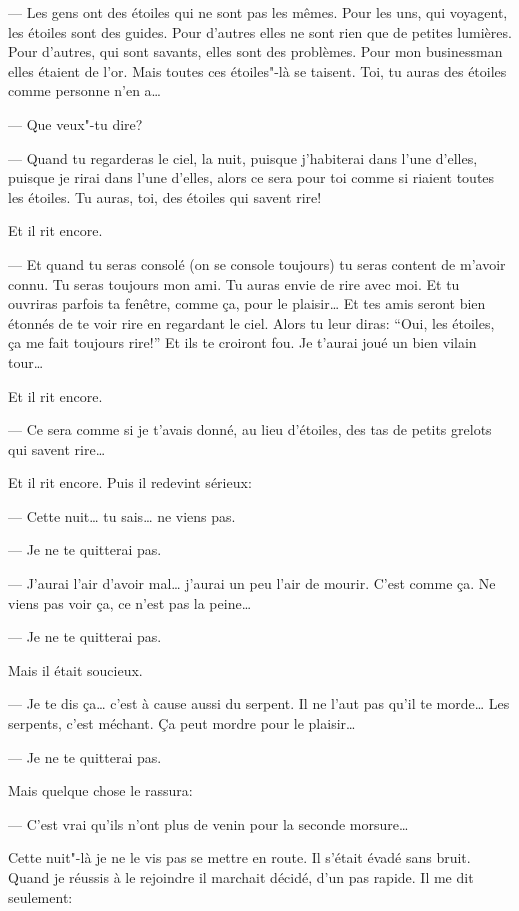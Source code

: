 \begin{Parallel}[p]{}{}
{--- Les gens ont des étoiles qui ne sont pas les mêmes. Pour les uns, qui
voyagent, les étoiles sont des guides. Pour d'autres elles ne sont rien que
de petites lumières. Pour d’autres, qui sont savants, elles sont des problèmes.
Pour mon businessman elles étaient de l'or. Mais toutes ces étoiles"-là se
taisent. Toi, tu auras des étoiles comme personne n'en a\ldots{}

--- Que veux"-tu dire?

--- Quand tu regarderas le ciel, la nuit, puisque j'habiterai dans l'une
d'elles, puisque je rirai dans l'une d'elles, alors ce sera pour toi comme si
riaient toutes les étoiles. Tu auras, toi, des étoiles qui savent rire!

Et il rit encore.

--- Et quand tu seras consolé (on se console toujours) tu seras content de
m'avoir connu. Tu seras toujours mon ami. Tu auras envie de rire avec moi. Et
tu ouvriras parfois ta fenêtre, comme ça, pour le plaisir\ldots{} Et tes amis
seront bien étonnés de te voir rire en regardant le ciel. Alors tu leur diras:
``Oui, les étoiles, ça me fait toujours rire!'' Et ils te croiront fou. Je
t'aurai joué un bien vilain tour\ldots{}

Et il rit encore.

--- Ce sera comme si je t'avais donné, au lieu d'étoiles, des tas de petits
grelots qui savent rire\ldots{}

Et il rit encore. Puis il redevint sérieux:

--- Cette nuit\ldots{} tu sais\ldots{} ne viens pas.

--- Je ne te quitterai pas.

--- J'aurai l'air d'avoir mal\ldots{} j'aurai un peu l'air de mourir. C'est
comme ça. Ne viens pas voir ça, ce n'est pas la peine\ldots{}

--- Je ne te quitterai pas.

Mais il était soucieux.

--- Je te dis ça\ldots{} c’est à cause aussi du serpent. Il ne l'aut pas qu'il
te morde\ldots{} Les serpents, c'est méchant. Ça peut mordre pour le plaisir\ldots{}

--- Je ne te quitterai pas.

Mais quelque chose le rassura:

--- C'est vrai qu'ils n'ont plus de venin pour la seconde morsure\ldots{}

\medskip

Cette nuit"-là je ne le vis pas se mettre en route. Il s’était évadé sans bruit.
Quand je réussis à le rejoindre il marchait décidé, d’un pas rapide. Il me dit
seulement:

}
\end{Parallel}
